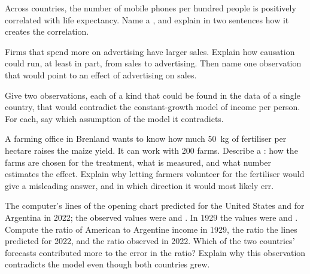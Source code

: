 \begin{exercise}[$\star\star$]\label{exo:g10:economic-models:10}
Across countries, the number of mobile phones per hundred people is positively correlated with life
expectancy. Name a , and explain in two sentences how it creates the correlation.
\end{exercise}

\begin{exercise}[$\star\star$]\label{exo:g10:economic-models:11}
Firms that spend more on advertising have larger sales. Explain how causation could run, at least in
part, from sales to advertising. Then name one observation that would point to an effect of
advertising on sales.
\end{exercise}

\begin{exercise}[$\star\star\star$]\label{exo:g10:economic-models:12}
Give two observations, each of a kind that could be found in the data of a single country, that
would contradict the constant-growth model of income per person. For each, say which assumption of
the model it contradicts.
\end{exercise}

\begin{exercise}[$\star\star\star$]\label{exo:g10:economic-models:13}
A farming office in Brenland wants to know how much \qty{50}{kg} of fertiliser per hectare raises
the maize yield. It can work with 200 farms. Describe a : how the farms are
chosen for the treatment, what is measured, and what number estimates the effect. Explain why
letting farmers volunteer for the fertiliser would give a misleading answer, and in which direction
it would most likely err.
\end{exercise}

\begin{exercise}[$\star\star\star$]\label{exo:g10:economic-models:14}
The computer's lines of the opening chart predicted  for the United States and
 for Argentina in 2022; the observed values were  and . In 1929
the values were  and . Compute the ratio of American to Argentine income in
1929, the ratio the lines predicted for 2022, and the ratio observed in 2022. Which of the two
countries' forecasts contributed more to the error in the ratio? Explain why this observation
contradicts the model even though both countries grew.
\end{exercise}

